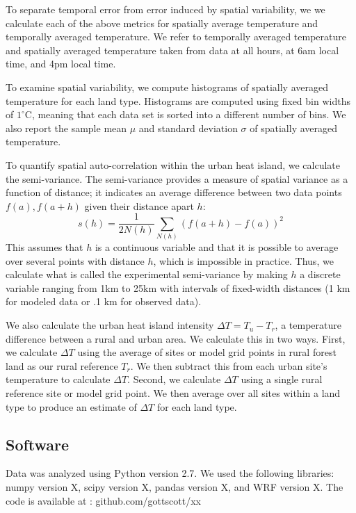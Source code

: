 To separate temporal error from error induced by spatial variability, we we calculate each of the above metrics for spatially average temperature and temporally averaged temperature. We refer to temporally averaged temperature  and spatially averaged temperature taken from data at all hours, at 6am local time, and 4pm local time. 

To examine spatial variability, we compute histograms of spatially averaged temperature for each land type. Histograms are computed using fixed bin widths of $1^\circ$C, meaning that each data set is sorted into a different number of bins. We also report the sample mean $\mu$ and standard deviation $\sigma$ of spatially averaged temperature. 

To quantify spatial auto-correlation within the urban heat island, we calculate the semi-variance. The semi-variance provides a measure of spatial variance as a function of distance; it indicates an average difference between two data points $f(a), f(a+h)$ given their distance apart $h$: 
\begin{equation}
 s(h) = \frac{1}{2 N(h)} \sum _{N(h)} \left(f(a+h) -f(a)\right)^2
\label{eq:semivariogram}
\end{equation}
This assumes that $h$ is a continuous variable and that it is possible to average over several points with distance $h$, which is impossible in practice. Thus, we calculate what is called the experimental semi-variance by making $h$ a discrete variable ranging from 1km to 25km with intervals of fixed-width distances (1 km for modeled data or .1 km for observed data). 

We also calculate the urban heat island intensity $\Delta T = T_u - T_r$, a temperature difference between a rural and urban area. We calculate this in two ways. First, we calculate $\Delta T$ using the average of sites or model grid points in rural forest land as our rural reference $T_r$. We then subtract this from each urban site's temperature to calculate $\Delta T$. 
Second, we calculate $\Delta T$ using a single rural reference site or model grid point. We then average over all sites within a land type to produce an estimate of $\Delta T$ for each land type. 

\subsection{Software}
Data was analyzed using Python version 2.7. We used the following libraries: numpy version X, scipy version X, pandas version X, and WRF version X. 
The code is available at :  github.com/gottscott/xx


